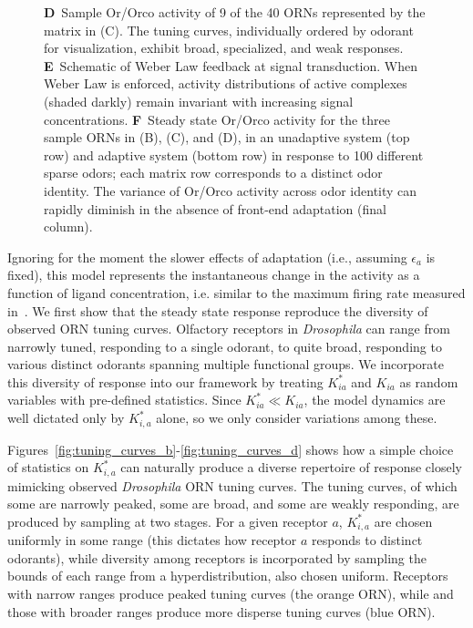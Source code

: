 \begin{figure}
{{		\textbf{D}~Sample Or/Orco activity of 9 of the 40 ORNs represented by the matrix in (C). The tuning curves, individually ordered by odorant for visualization, exhibit broad, specialized, and weak responses. 
		\textbf{E}~Schematic of Weber Law feedback at signal transduction. When Weber Law is enforced, activity distributions of active complexes (shaded darkly) remain invariant with increasing signal concentrations. 
		\textbf{F}~Steady state Or/Orco activity for the three sample ORNs in (B), (C), and (D), in an unadaptive system (top row) and adaptive system (bottom row) in response to 100 different sparse odors; each matrix row corresponds to a distinct odor identity. The variance of Or/Orco activity across odor identity can rapidly diminish in the absence of front-end adaptation (final column).
		}}
	\label{fig:tuning_curves}
\end{figure}

Ignoring for the moment the slower effects of adaptation (i.e., assuming $\epsilon_a$ is fixed), this model represents the instantaneous change in the activity as a function of ligand concentration, i.e. similar to the maximum firing rate measured in~\cite{hallem_carlson}. We first show that the steady state response reproduce the diversity of observed ORN tuning curves. Olfactory receptors in \textit{Drosophila} can range from narrowly tuned, responding to a single odorant, to quite broad, responding to various distinct odorants spanning multiple functional groups. We incorporate this diversity of response into our framework by treating $K^*_{ia}$ and $K_{ia}$ as random variables with pre-defined statistics. Since $K^*_{ia} \ll K_{ia}$, the model dynamics are well dictated only by $K^*_{i, a}$ alone, so we only consider variations among these. 

Figures~\ref{fig:tuning_curves_b}-\ref{fig:tuning_curves_d} shows how a simple choice of statistics on $K^*_{i, a}$ can naturally produce a diverse repertoire of response closely mimicking observed \textit{Drosophila} ORN tuning curves. The tuning curves, of which some are narrowly peaked, some are broad, and some are weakly responding, are produced by sampling at two stages. For a given receptor $a$, $K^*_{i,a}$ are chosen uniformly in some range (this dictates how receptor $a$ responds to distinct odorants), while diversity among receptors is incorporated by sampling the bounds of each range from a hyperdistribution, also chosen uniform. Receptors with narrow ranges produce peaked tuning curves (the orange ORN), while and those with broader ranges produce more disperse tuning curves (blue ORN). 

